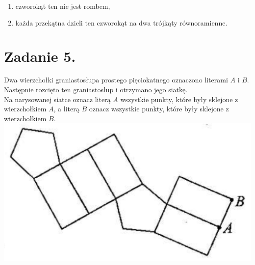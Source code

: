 \documentclass[10pt]{article}
\begin{document}
\begin{enumerate}
  \item czworokąt ten nie jest rombem,
  \item każda przekątna dzieli ten czworokąt na dwa trójkąty równoramienne.
\end{enumerate}

\section*{Zadanie 5.}
Dwa wierzchołki graniastosłupa prostego pięciokatnego oznaczono literami \(A\) i \(B\). Następnie rozcięto ten graniastosłup i otrzymano jego siatkę.\\
Na narysowanej siatce oznacz literą \(A\) wszystkie punkty, które były sklejone z wierzchołkiem \(A\), a literą \(B\) oznacz wszystkie punkty, które były sklejone z wierzchołkiem \(B\).\\
\includegraphics[max width=\textwidth, center]{2024_11_21_3a60c5cfbd5f3f387295g-1}
\end{document}
